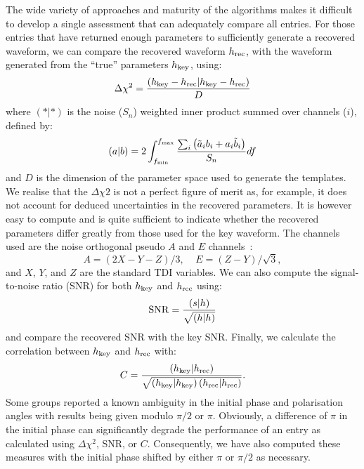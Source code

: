 \documentclass[12pt]{iopart}
\begin{document}
The wide variety of approaches and maturity of the algorithms makes it difficult to develop a single assessment that can adequately compare all entries. For those entries that have returned enough parameters to sufficiently generate a recovered waveform, we can compare the recovered waveform $h_{\rm rec}$, with the waveform generated from the ``true'' parameters $h_{\rm key}$, using:
\begin{equation}
\label{deltachi}
\Delta \chi^2 = \frac{\left(h_{\rm key} - h_{\rm rec}|h_{\rm key} - h_{\rm rec}\right)}{D}
\end{equation}
where $(*|*)$ is the noise ($S_n$) weighted inner product summed over channels ($i$), defined by:
\begin{equation}
\left(a|b\right) = 2 \int_{f_{\rm min}}^{f_{\rm max}}{\frac{\sum_{i}{\left(\tilde{a}_ib_i+a_i\tilde{b}_i\right)}}{S_n}df}
\end{equation}
and $D$ is the dimension of the parameter space used to generate the templates. We realise that the $\Delta\chi2$ is not a perfect figure of merit as, for example, it does not account for deduced uncertainties in the recovered parameters. It is however easy to compute and is quite sufficient to indicate whether the recovered parameters differ greatly from those used for the key waveform. The channels used are the noise orthogonal pseudo $A$ and $E$ channels~\cite{prince02}:
\begin{equation}
A = \left(2X - Y - Z\right)/3,~~~~~E = \left(Z - Y\right)/\sqrt{3},
\end{equation}
and $X$, $Y$, and $Z$ are the standard TDI variables. We can also compute the signal-to-noise ratio (SNR) for both $h_{\rm key}$ and $h_{\rm rec}$ using:
\begin{equation}
\label{snr}
{\rm SNR} = \frac{\left(s|h\right)}{\sqrt{\left(h|h\right)}}
\end{equation}
and compare the recovered SNR with the key SNR. Finally, we calculate the correlation between $h_{\rm key}$ and $h_{\rm rec}$ with:
\begin{equation}
\label{cor}
C = \frac{\left(h_{\rm key}|h_{\rm rec}\right)}{\sqrt{\left(h_{\rm key}|h_{\rm key}\right)\left(h_{\rm rec}|h_{\rm rec}\right)}}.
\end{equation}
Some groups reported a known ambiguity in the initial phase and polarisation angles with results being given modulo $\pi/2$ or $\pi$. Obviously, a difference of $\pi$ in the initial phase can significantly degrade the performance of an entry as calculated using $\Delta\chi^2$, SNR, or $C$. Consequently, we have also computed these measures with the initial phase shifted by either $\pi$ or $\pi/2$ as necessary.
\end{document}
